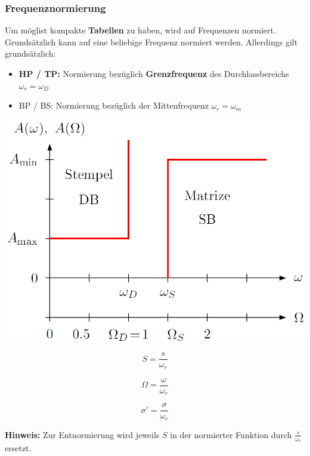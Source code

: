 \subsubsection{Frequenznormierung}
 
Um möglist kompakte \textbf{Tabellen} zu haben, wird auf Frequenzen normiert. Grundsätzlich kann auf eine beliebige Frequenz normiert
werden. Allerdings gilt grundsätzlich:

\begin{itemize}
    \item \textbf{HP / TP:} Normierung bezüglich \textbf{Grenzfrequenz} des Durchlassbereichs $\omega_r = \omega_D$
    \item BP / BS: Normierung bezüglich der Mittenfrequenz $\omega_r = \omega_m$
\end{itemize}
\vspace{0.2cm}

\begin{minipage}[c]{0.48\columnwidth}
    \includegraphics[width=\columnwidth]{images/filter_toleranzschema_frequenznormierung.png}
\end{minipage}
\hfill
\begin{minipage}[c]{0.48\columnwidth}
    \begin{center}
       \textbf{}  
    \end{center}

    \vspace{-0.3cm}
    \begin{minipage}[c]{0.3\columnwidth}
        $$ \boxed{ S = \frac{s}{\omega_r}} $$
    \end{minipage}
    \hfill
    \begin{minipage}[c]{0.3\columnwidth}
        $$ \boxed{ \Omega = \frac{\omega}{\omega_r}} $$
    \end{minipage}
    \hfill
    \begin{minipage}[c]{0.3\columnwidth}
        $$ \boxed{ \sigma' = \frac{\sigma}{\omega_r}} $$ 
    \end{minipage}

    \vspace{0.2cm}
    \textbf{Hinweis:} Zur Entnormierung wird jeweils $S$ in der normierter Funktion durch $\frac{s}{\omega_r}$ ersetzt.
\end{minipage}


